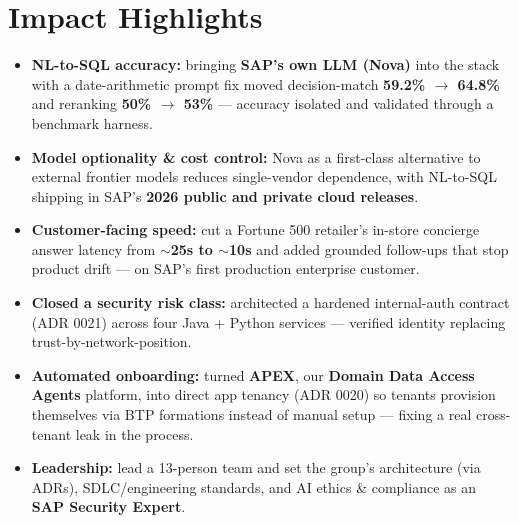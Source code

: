 \documentclass[10pt,letterpaper]{article}
\begin{document}
\section{Impact Highlights}
\begin{itemize}
  \item \textbf{NL-to-SQL accuracy:} bringing \textbf{SAP's own LLM (Nova)} into the stack with a
  date-arithmetic prompt fix moved decision-match \textbf{59.2\% $\rightarrow$ 64.8\%} and reranking
  \textbf{50\% $\rightarrow$ 53\%} --- accuracy isolated and validated through a benchmark harness.
  \item \textbf{Model optionality \& cost control:} Nova as a first-class alternative to external
  frontier models reduces single-vendor dependence, with NL-to-SQL shipping in SAP's \textbf{2026 public
  and private cloud releases}.
  \item \textbf{Customer-facing speed:} cut a Fortune 500 retailer's in-store concierge answer latency
  from \textbf{$\sim$25s to $\sim$10s} and added grounded follow-ups that stop product drift --- on SAP's
  first production enterprise customer.
  \item \textbf{Closed a security risk class:} architected a hardened internal-auth contract (ADR 0021)
  across four Java + Python services --- verified identity replacing trust-by-network-position.
  \item \textbf{Automated onboarding:} turned \textbf{APEX}, our \textbf{Domain Data Access Agents}
  platform, into direct app tenancy (ADR 0020) so tenants provision themselves via BTP formations
  instead of manual setup --- fixing a real cross-tenant leak in the process.
  \item \textbf{Leadership:} lead a 13-person team and set the group's architecture (via ADRs),
  SDLC/engineering standards, and AI ethics \& compliance as an \textbf{SAP Security Expert}.
\end{itemize}

\end{document}
